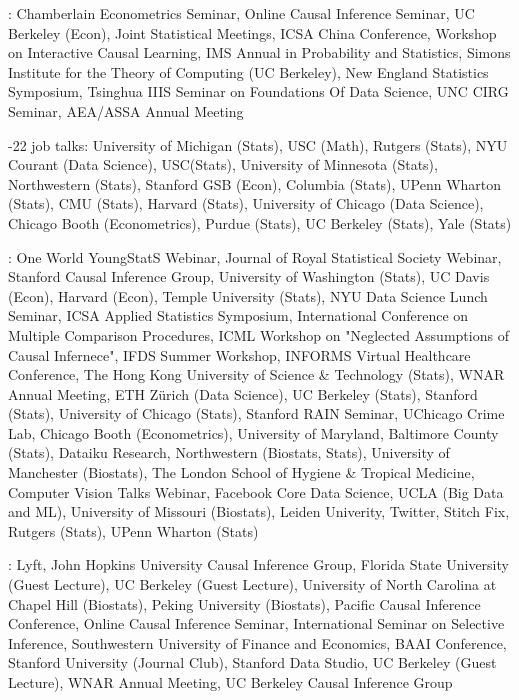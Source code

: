 \documentclass{article}
\begin{document}
\vspace{4mm}
: Chamberlain Econometrics Seminar, Online Causal Inference Seminar, UC Berkeley (Econ), Joint Statistical Meetings, ICSA China Conference, Workshop on Interactive Causal Learning, IMS Annual in Probability and Statistics, Simons Institute for the Theory of Computing (UC Berkeley), New England Statistics Symposium, Tsinghua IIIS Seminar on Foundations Of Data Science, UNC CIRG Seminar, AEA/ASSA Annual Meeting

\vspace{4mm}
-22 job talks: University of Michigan (Stats), USC (Math), Rutgers (Stats), NYU Courant (Data Science), USC(Stats), University of Minnesota (Stats), Northwestern (Stats), Stanford GSB (Econ), Columbia (Stats), UPenn Wharton (Stats), CMU (Stats), Harvard (Stats), University of Chicago (Data Science), Chicago Booth (Econometrics), Purdue (Stats), UC Berkeley (Stats), Yale (Stats)

\vspace{4mm}
: One World YoungStatS Webinar, Journal of Royal Statistical Society Webinar, Stanford Causal Inference Group, University of Washington (Stats), UC Davis (Econ), Harvard (Econ), Temple University (Stats), NYU Data Science Lunch Seminar, ICSA Applied Statistics Symposium, International Conference on Multiple Comparison Procedures, ICML Workshop on "Neglected Assumptions of Causal Infernece", IFDS Summer Workshop, INFORMS Virtual Healthcare Conference, The Hong Kong University of Science \& Technology (Stats), WNAR Annual Meeting, ETH Z\"{u}rich (Data Science), UC Berkeley (Stats), Stanford (Stats), University of Chicago (Stats), Stanford RAIN Seminar, UChicago Crime Lab, Chicago Booth (Econometrics), University of Maryland, Baltimore County (Stats), Dataiku Research, Northwestern (Biostats, Stats), University of Manchester (Biostats), The London School of Hygiene \& Tropical Medicine, Computer Vision Talks Webinar, Facebook Core Data Science, UCLA (Big Data and ML), University of Missouri (Biostats), Leiden Univerity, Twitter, Stitch Fix, Rutgers (Stats), UPenn Wharton (Stats)

\vspace{4mm}
:
Lyft, John Hopkins University Causal Inference Group, Florida State University (Guest Lecture), UC Berkeley (Guest Lecture), University of North Carolina at Chapel Hill (Biostats), Peking University (Biostats), Pacific Causal Inference Conference, Online Causal Inference Seminar, International Seminar on Selective Inference, Southwestern University of Finance and Economics, BAAI Conference, Stanford University (Journal Club), Stanford Data Studio, UC Berkeley (Guest Lecture), WNAR Annual Meeting, UC Berkeley Causal Inference Group
\end{document}
